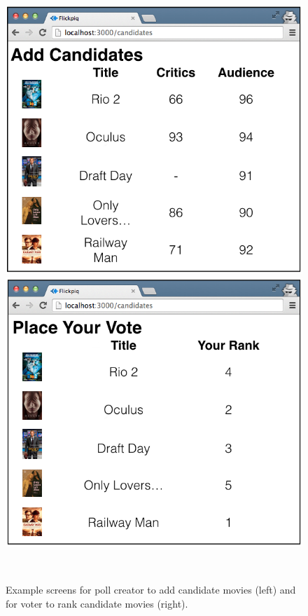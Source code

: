 \documentclass[12pt,letterpaper]{article} %
\begin{document}
\begin{figure}
 \begin{center}
  \begin{minipage}{0.45\textwidth}
    \begin{center}
      \includegraphics[scale=0.25]{../graphics/add-candidates.png}
    \end{center}
  \end{minipage}
  \hspace{0.05\textwidth}
  \begin{minipage}{0.45\textwidth}
    \begin{center}
      \includegraphics[scale=0.25]{../graphics/place-vote.png}
    \end{center}
  \end{minipage} \\
  \caption{Example screens for poll creator to add candidate movies (left) and for voter to rank candidate movies (right).}
  \label{example-screens}
 \end{center}
\end{figure}
\end{document}
